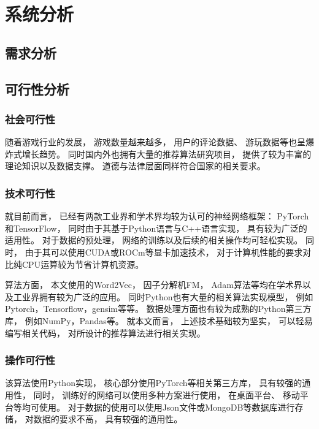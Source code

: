 \section{系统分析}

\subsection{需求分析}

\subsection{可行性分析}

\subsubsection{社会可行性}

随着游戏行业的发展，
游戏数量越来越多，
用户的评论数据、
游玩数据等也呈爆炸式增长趋势。
同时国内外也拥有大量的推荐算法研究项目，
提供了较为丰富的理论知识以及数据支撑。
道德与法律层面同样符合国家的相关要求。

\subsubsection{技术可行性}

就目前而言，
已经有两款工业界和学术界均较为认可的神经网络框架：
PyTorch和TensorFlow，
同时由于其基于Python语言与C++语言实现，
具有较为广泛的适用性。
对于数据的预处理，
网络的训练以及后续的相关操作均可轻松实现。
同时，
由于其可以使用CUDA或ROCm等显卡加速技术，
对于计算机性能的要求对比纯CPU运算较为节省计算机资源。

算法方面，
本文使用的Word2Vec，
因子分解机FM，
Adam算法等均在学术界以及工业界拥有较为广泛的应用。
同时Python也有大量的相关算法实现模型，
例如Pytorch，Tensorflow，gensim等等。
数据处理方面也有较为成熟的Python第三方库，
例如NumPy，Pandas等。
就本文而言，
上述技术基础较为坚实，
可以轻易编写相关代码，
对所设计的推荐算法进行相关实现。

\subsubsection{操作可行性}

该算法使用Python实现，
核心部分使用PyTorch等相关第三方库，
具有较强的通用性，
同时，
训练好的网络可以使用多种方案进行使用，
在桌面平台、
移动平台等均可使用。
对于数据的使用可以使用Json文件或MongoDB等数据库进行存储，
对数据的要求不高，
具有较强的通用性。